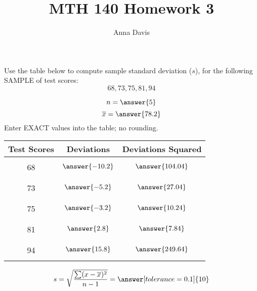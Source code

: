 \documentclass{ximera}
\author{Anna Davis} \title{MTH 140 Homework 3}
\begin{document}
\begin{abstract}

\end{abstract}
\maketitle
 
\begin{problem}\label{prob:140hom3prob1}

Use the table below to compute sample standard deviation ($s$), for the following SAMPLE of test scores:
$$68, 73, 75, 81, 94$$

$$n=\answer{5}$$
$$\overline{x}=\answer{78.2}$$
Enter EXACT values into the table; no rounding.
\begin{center}
\begin{tabular}{|c|c|c|}
Test Scores & Deviations & Deviations Squared  \\
 \hline
 \hline
   & &\\
 68 &$\answer{-10.2}$  & $\answer{104.04}$ \\
  & &\\
  \hline
   & &\\
 73 &$\answer{-5.2}$  & $\answer{27.04}$\\
  & &\\
 \hline
  & &\\
 75 &$\answer{-3.2}$ &$\answer{10.24}$ \\
  & &\\
 \hline
  & &\\
 81 &$\answer{2.8}$  &$\answer{7.84}$ \\
  & &\\
 \hline
  & &\\
 94 &$\answer{15.8}$  &$\answer{249.64}$ \\
  & &\\
 \hline
  
\end{tabular}
\end{center}

$$s =\sqrt{\frac{\sum (x-\overline{x})^2}{n-1}}=\answer[tolerance=0.1]{10}$$
 \end{problem}
\end{document}
